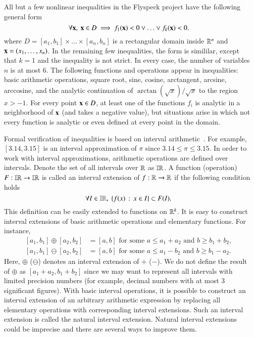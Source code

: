 All but a few nonlinear inequalities in the Flyspeck project have the
following general form
\begin{equation}\label{eqn:D}
\forall {\bf x},\ {\bf x} \in D \implies f_1({\bf x}) < 0 \vee \ldots \vee f_k({\bf x}) < 0.
\end{equation}
where $D = [a_1,b_1] \times \ldots \times [a_n, b_n]$ is a rectangular
domain inside $\mathbb{R}^n$ and ${\bf x} = (x_1,\ldots,x_n)$. In the remaining
few inequalities, the form is simililar, except that $k=1$ and the
inequality is not strict.  In every case, the number of variables $n$
is at most $6$. The following functions and operations appear in
inequalities: basic arithmetic operations, square root, sine, cosine,
arctangent, arcsine, arccosine, and the analytic continuation of
$\arctan(\sqrt{x})/\sqrt{x}$ to the region $x > -1$.  For every point
${\bf x}\in D$, at least one of the functions $f_i$ is analytic in a
neighborhood of ${\bf x}$ (and takes a negative value), but situations
arise in which not every function is analytic or even defined at every
point in the domain.

Formal verification of inequalities is based on interval
arithmetic~\cite{Moore:1966:IntervalAnalysis}. 
 For example, $[3.14, 3.15]$ is an
interval approximation of $\pi$ since $3.14 \le \pi \le 3.15$. 
In order to work with interval approximations,
arithmetic operations are defined over intervals. Denote the set of
all intervals over $\mathbb{R}$ as $\mathbb{IR}$. A function (operation) $F:\mathbb{IR} \to
\mathbb{IR}$ is called an interval extension of $f:\mathbb{R} \to \mathbb{R}$ if the following
condition holds
\begin{equation*}
\forall I \in \mathbb{IR},\ \{ f(x)\,:\,x \in I \} \subset F(I).
\end{equation*}
This definition can be easily extended to functions on $\mathbb{R}^k$. It is
easy to construct interval extensions of basic arithmetic operations
and elementary functions. For instance,
\begin{equation*}
\begin{split}
[a_1,b_1] \oplus [a_2,b_2] &= [a, b] \text { for some $a \le a_1 + a_2$ and $b \ge b_1 + b_2$},\\
[a_1,b_1] \ominus [a_2,b_2] &= [a, b] \text { for some $a \le a_1 - b_2$ and $b \ge b_1 - a_2$}.
\end{split}
\end{equation*}
Here, $\oplus$ ($\ominus$) denotes an interval extension of $+$
($-$). We do not define the result of $\oplus$ as $[a_1 + a_2, b_1 +
b_2]$ since we may want to represent all intervals with limited
precision numbers (for example, decimal numbers with at most 3
significant figures). With basic interval operations, it is possible
to construct an interval extension of an arbitrary arithmetic
expression by replacing all elementary operations with corresponding
interval extensions. Such an interval extension is called the natural
interval extension. Natural interval extensions could be imprecise and
there are several ways to improve them.

